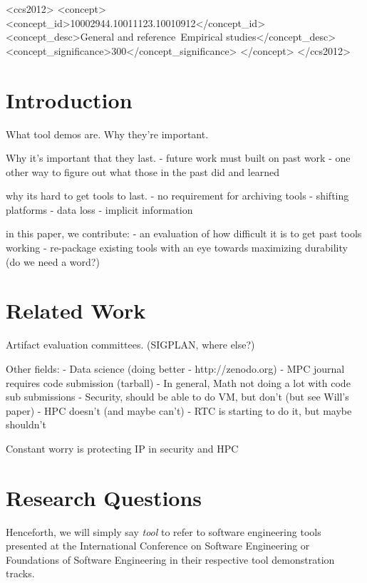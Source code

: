 \documentclass{sig-alternate-05-2015}
\begin{document}
%
\begin{CCSXML}
<ccs2012>
<concept>
<concept_id>10002944.10011123.10010912</concept_id>
<concept_desc>General and reference~Empirical studies</concept_desc>
<concept_significance>300</concept_significance>
</concept>
</ccs2012>
\end{CCSXML}


\printccsdesc


\section{Introduction}

What tool demos are.
Why they're important.

Why it's important that they last.
- future work must built on past work
- one other way to figure out what those in the past did and learned

why its hard to get tools to last.
- no requirement for archiving tools
- shifting platforms
- data loss 
- implicit information

in this paper, we contribute:
- an evaluation of how difficult it is to get past tools working
- re-package existing tools with an eye towards maximizing durability (do we need a word?)

\section{Related Work}

Artifact evaluation committees. (SIGPLAN, where else?)

Other fields:
- Data science (doing better - http://zenodo.org)
- MPC journal requires code submission (tarball)
- In general, Math not doing a lot with code sub submissions
- Security, should be able to do VM, but don't (but see Will's paper)
- HPC doesn't (and maybe can't)
- RTC is starting to do it, but maybe shouldn't

Constant worry is protecting IP in security and HPC


\section{Research Questions}

Henceforth, we will simply say \textit{tool}
to refer to software engineering tools presented at
the International Conference on Software Engineering
or Foundations of Software Engineering in their
respective tool demonstration tracks.
\end{document}
